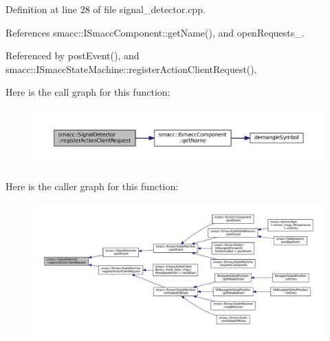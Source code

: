 Definition at line 28 of file signal\+\_\+detector.\+cpp.



References smacc\+::\+I\+Smacc\+Component\+::get\+Name(), and open\+Requests\+\_\+.



Referenced by post\+Event(), and smacc\+::\+I\+Smacc\+State\+Machine\+::register\+Action\+Client\+Request().




Here is the call graph for this function\+:
\nopagebreak
\begin{figure}[H]
\begin{center}
\leavevmode
\includegraphics[width=350pt]{classsmacc_1_1SignalDetector_a9a28cc1e9dcf7d204f3589fad8291bfd_cgraph}
\end{center}
\end{figure}




Here is the caller graph for this function\+:
\nopagebreak
\begin{figure}[H]
\begin{center}
\leavevmode
\includegraphics[width=350pt]{classsmacc_1_1SignalDetector_a9a28cc1e9dcf7d204f3589fad8291bfd_icgraph}
\end{center}
\end{figure}



